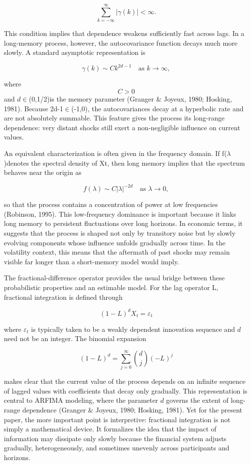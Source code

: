 \documentclass[12pt]{article}
\begin{document}
\[\sum_{k=-\infty}^{\infty} |\gamma(k)| < \infty.\]

This condition implies that dependence weakens sufficiently fast across lags. In a long-memory process, however, the autocovariance function decays much more slowly. A standard asymptotic representation is

\[\gamma(k) \sim C k^{2d-1} \quad \text{as } k \to \infty,\]

where $$C>0$$ and $d$$\in$(0,1/2)is the memory parameter (Granger \& Joyeux, 1980; Hosking, 1981). Because 2d-1$\in$(-1,0), the autocovariances decay at a hyperbolic rate and are not absolutely summable. This feature gives the process its long-range dependence: very distant shocks still exert a non-negligible influence on current values.

An equivalent characterization is often given in the frequency domain. If f($\lambda$)denotes the spectral density of Xt, then long memory implies that the spectrum behaves near the origin as

\[f(\lambda) \sim C |\lambda|^{-2d} \quad \text{as } \lambda \to 0,\]

so that the process contains a concentration of power at low frequencies (Robinson, 1995). This low-frequency dominance is important because it links long memory to persistent fluctuations over long horizons. In economic terms, it suggests that the process is shaped not only by transitory noise but by slowly evolving components whose influence unfolds gradually across time. In the volatility context, this means that the aftermath of past shocks may remain visible far longer than a short-memory model would imply.

The fractional-difference operator provides the usual bridge between these probabilistic properties and an estimable model. For the lag operator L, fractional integration is defined through

\[(1-L)^d X_t = \varepsilon_t\]

where $\varepsilon_t$ is typically taken to be a weakly dependent innovation sequence and $d$ need not be an integer. The binomial expansion

\[(1-L)^d = \sum_{j=0}^{\infty} \binom{d}{j}(-L)^j\]

makes clear that the current value of the process depends on an infinite sequence of lagged values with coefficients that decay only gradually. This representation is central to ARFIMA modeling, where the parameter $d$ governs the extent of long-range dependence (Granger \& Joyeux, 1980; Hosking, 1981). Yet for the present paper, the more important point is interpretive: fractional integration is not simply a mathematical device. It formalizes the idea that the impact of information may dissipate only slowly because the financial system adjusts gradually, heterogeneously, and sometimes unevenly across participants and horizons.
\end{document}
